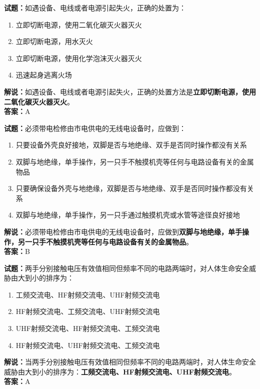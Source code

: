 \documentclass{ctexbook}
\begin{document}
\bigskip



\noindent\textbf{试题：}如遇设备、电线或者电源引起失火，正确的处置为：
\begin{enumerate}[leftmargin=3em]
	\item 立即切断电源，使用二氧化碳灭火器灭火
	\item 立即切断电源，用水灭火
	\item 立即切断电源，使用化学泡沫灭火器灭火
	\item 迅速起身逃离火场
\end{enumerate}
\noindent\textbf{解说：}如遇设备、电线或者电源引起失火，正确的处置方法是\textbf{立即切断电源，使用二氧化碳灭火器灭火}。\\\noindent\textbf{答案：}A


\bigskip



\noindent\textbf{试题：}必须带电检修由市电供电的无线电设备时，应做到：
\begin{enumerate}[leftmargin=3em]
	\item 只要设备外壳良好接地，双脚是否与地绝缘、双手是否同时操作都没有关系
	\item 双脚与地绝缘，单手操作，另一只手不触摸机壳等任何与电路设备有关的金属物品
	\item 只要确保设备外壳与地绝缘，双脚是否与地绝缘、双手是否同时操作都没有关系
	\item 双脚与地绝缘，单手操作，另一只手通过触摸机壳或水管等途径良好接地
\end{enumerate}
\noindent\textbf{解说：}必须带电检修由市电供电的无线电设备时，应做到\textbf{双脚与地绝缘，单手操作，另一只手不触摸机壳等任何与电路设备有关的金属物品}。\\\noindent\textbf{答案：}B


\bigskip



\noindent\textbf{试题：}两手分别接触电压有效值相同但频率不同的电路两端时，对人体生命安全威胁由大到小的排序为：
\begin{enumerate}[leftmargin=3em]
	\item 工频交流电、HF射频交流电、UHF射频交流电
	\item HF射频交流电、工频交流电、UHF射频交流电
	\item UHF射频交流电、HF射频交流电、工频交流电
	\item HF射频交流电、UHF射频交流电、工频交流电
\end{enumerate}
\noindent\textbf{解说：}当两手分别接触电压有效值相同但频率不同的电路两端时，对人体生命安全威胁由大到小的排序为：\textbf{工频交流电、HF射频交流电、UHF射频交流电}。\\\noindent\textbf{答案：}A
\end{document}
